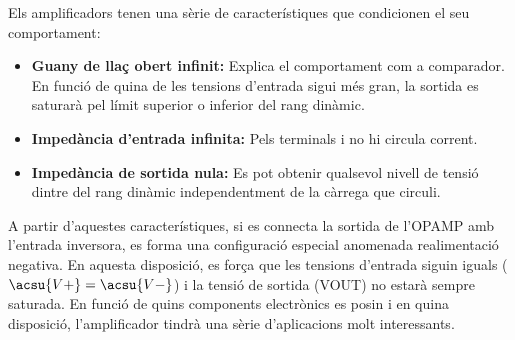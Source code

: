 Els amplificadors tenen una sèrie de característiques que condicionen el seu comportament:

\begin{itemize}
	
	\item{\textbf{Guany de llaç obert infinit: }}Explica el comportament com a comparador. En funció de quina de les tensions d'entrada sigui més gran, la sortida es saturarà pel límit superior o inferior del rang dinàmic.
	
	\item{\textbf{Impedància d'entrada infinita: }}Pels terminals  i  no hi circula corrent.
	
	\item{\textbf{Impedància de sortida nula: }}Es pot obtenir qualsevol nivell de tensió dintre del rang dinàmic independentment de la càrrega que circuli.
	
\end{itemize}

A partir d'aquestes característiques, si es connecta la sortida de l'\ac{OPAMP} amb l'entrada inversora, es forma una configuració especial anomenada realimentació negativa. En aquesta disposició, es força que les tensions d'entrada siguin iguals ($ \acsu{V+} = \acsu{V-} $) i la tensió de sortida (\ac{VOUT}) no estarà sempre saturada. En funció de quins components electrònics es posin i en quina disposició, l'amplificador tindrà una sèrie d'aplicacions molt interessants.

